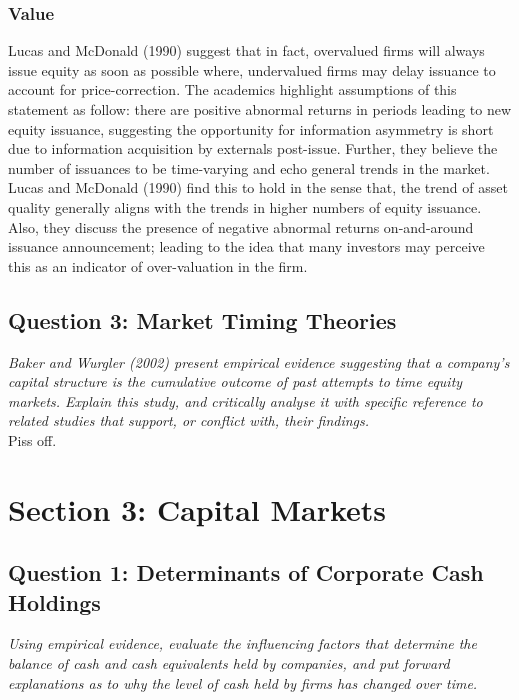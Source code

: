 \documentclass[11pt, english]{article}
\begin{document}
		\subsubsection*{Value}

	Lucas and McDonald (1990) suggest that in fact, overvalued firms will always issue equity as soon as possible where, undervalued firms may delay issuance to account for price-correction. The academics highlight assumptions of this statement as follow: there are positive abnormal returns in periods leading to new equity issuance, suggesting the opportunity for information asymmetry is short due to information acquisition by externals post-issue. Further, they believe the number of issuances to be time-varying and echo general trends in the market. Lucas and McDonald (1990) find this to hold in the sense that, the trend of asset quality generally aligns with the trends in higher numbers of equity issuance. Also, they discuss the presence of negative abnormal returns on-and-around issuance announcement; leading to the idea that many investors may perceive this as an indicator of over-valuation in the firm.

	\newpage

	\subsection{Question 3: Market Timing Theories}

	\textit{Baker and Wurgler (2002) present empirical evidence suggesting that a company's capital structure is the cumulative outcome of past attempts to time equity markets. Explain this study, and critically analyse it with specific reference to related studies that support, or conflict with, their findings.}\\

	Piss off.

\newpage

\section{Section 3: Capital Markets}

	\subsection{Question 1: Determinants of Corporate Cash Holdings}

	\textit{Using empirical evidence, evaluate the influencing factors that determine the balance of cash and cash equivalents held by companies, and put forward explanations as to why the level of cash held by firms has changed over time.}
\end{document}
